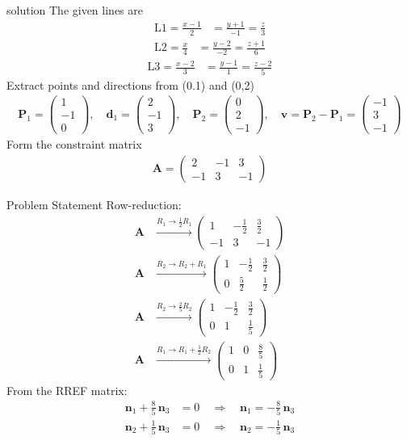 \documentclass{beamer}
\numberwithin{equation}{section}
\theoremstyle{remark}
\newcommand{\myvec}[1]{\ensuremath{\begin{pmatrix}#1\end{pmatrix}}}
\let\vec\mathbf
\begin{document}
\begin{frame}{solution}
\noindent The given lines are
\begin{align}
\text{L1} = \frac{x-1}{2} &= \frac{y+1}{-1} = \frac{z}{3}
\end{align}
\begin{align}
\text{L2} = \frac{x}{4} &= \frac{y-2}{-2} = \frac{z+1}{6}
\end{align}
\begin{align}
\text{L3} = \frac{x-2}{3} &= \frac{y-1}{1} = \frac{z-2}{5}
\end{align}
\noindent Extract points and directions from (0.1) and (0,2) 
\begin{align}
\vec{P}_1 = \myvec{1\\-1\\0},\quad \vec{d}_1 = \myvec{2\\-1\\3},\quad
\vec{P}_2 = \myvec{0\\2\\-1},\quad \vec{v} = \vec{P}_2 - \vec{P}_1 = \myvec{-1\\3\\-1}
\end{align}
\noindent Form the constraint matrix
\begin{align}
\vec{A} = \myvec{2 & -1 & 3 \\ -1 & 3 & -1}
\end{align}
\end{frame}
\begin{frame}{Problem Statement}
\noindent Row-reduction:
\begin{align}
\vec{A} &\xrightarrow{R_1 \to \tfrac{1}{2}R_1} \myvec{1 & -\tfrac{1}{2} & \tfrac{3}{2} \\ -1 & 3 & -1} \\[6pt]
\vec{A} &\xrightarrow{R_2 \to R_2 + R_1} \myvec{1 & -\tfrac{1}{2} & \tfrac{3}{2} \\ 0 & \tfrac{5}{2} & \tfrac{1}{2}} \\[6pt]
\vec{A} &\xrightarrow{R_2 \to \tfrac{2}{5}R_2} \myvec{1 & -\tfrac{1}{2} & \tfrac{3}{2} \\ 0 & 1 & \tfrac{1}{5}} \\[6pt]
\vec{A} &\xrightarrow{R_1 \to R_1 + \tfrac{1}{2}R_2} \myvec{1 & 0 & \tfrac{8}{5} \\ 0 & 1 & \tfrac{1}{5}}
\end{align}
\noindent From the RREF matrix:
\begin{align}
\vec{n}_1 + \frac{8}{5}\,\vec{n}_3 &= 0 \quad \Rightarrow \quad \vec{n}_1 = -\frac{8}{5}\,\vec{n}_3
\end{align}
\begin{align}
\vec{n}_2 + \frac{1}{5}\,\vec{n}_3 &= 0 \quad \Rightarrow \quad \vec{n}_2 = -\frac{1}{5}\,\vec{n}_3
\end{align}
\end{frame}
\end{document}

